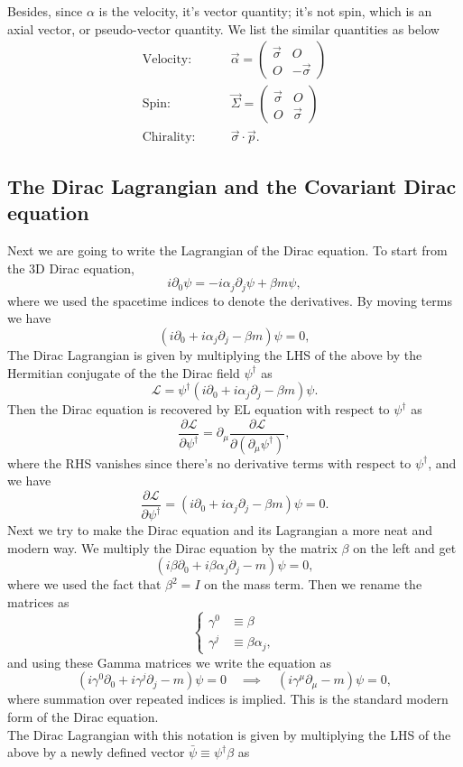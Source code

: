 \documentclass{article}
\newcommand{\be}{\begin{equation}}
\newcommand{\ee}{\end{equation}}
\newcommand{\ba}{\begin{array}}
\newcommand{\ea}{\end{array}}
\newcommand{\p}{\partial}
\renewcommand{\1}{\left}
\renewcommand{\2}{\right}
\newcommand{\ma}{\mathcal}
\newcommand{\rar}{\quad\implies\quad}
\newcommand{\m}{\mu}
\newcommand{\al}{\alpha}
\newcommand{\bet}{\beta}
\newcommand{\sig}{\sigma}
\begin{document}
Besides, since $\al$ is the velocity, it's vector quantity; it's not spin, which is an axial vector, or pseudo-vector quantity. We list the similar quantities as below
\be\begin{split}
\text{Velocity:}&\quad\quad \vec\al=\1(\ba{cc}\vec\sig&O\\O&-\vec\sig\ea\2)\\
\text{Spin:}&\quad\quad \vec\Sigma=\1(\ba{cc}\vec\sig&O\\O&\vec\sig\ea\2)\\
\text{Chirality:}&\quad\quad \vec\sig\cdot\vec p.
\end{split}\ee

\subsection{The Dirac Lagrangian and the Covariant Dirac equation}
Next we are going to write the Lagrangian of the Dirac equation. To start from the 3D Dirac equation,
\be
i\p_0\psi=-i\al_j\p_j\psi+\bet m\psi,
\ee
where we used the spacetime indices to denote the derivatives. By moving terms we have
\be
(i\p_0+i\al_j\p_j-\bet m)\psi=0,
\ee
The Dirac Lagrangian is given by multiplying the LHS of the above by the Hermitian conjugate of the  the Dirac field $\psi^\dag$ as
\be
\ma L=\psi^\dag(i\p_0+i\al_j\p_j-\bet m)\psi.
\ee
Then the Dirac equation is recovered by EL equation with respect to $\psi^\dag$ as 
\be
\frac{\p\ma L}{\p\psi^\dag}=\p_\m\frac{\p\ma L}{\p(\p_\m\psi^\dag)},
\ee
where the RHS vanishes since there's no derivative terms with respect to $\psi^\dag$, and we have
\be
\frac{\p\ma L}{\p\psi^\dag}=(i\p_0+i\al_j\p_j-\bet m)\psi=0.
\ee
Next we try to make the Dirac equation and its Lagrangian a more neat and modern way. We multiply the Dirac equation by the matrix $\bet$ on the left and get
\be
(i\bet\p_0+i\bet\al_j\p_j- m)\psi=0,
\ee
where we used the fact that $\bet^2=I$ on the mass term.
Then we rename the matrices as
\be\1\{\begin{split}
\gamma^0&\equiv\bet\\
\gamma^j&\equiv\bet\al_j,
\end{split}\2.\ee
and using these Gamma matrices we write the equation as
\be
(i\gamma^0\p_0+i\gamma^j\p_j-m)\psi=0 \rar (i\gamma^\m\p_\m-m)\psi= 0,
\ee
where summation over repeated indices is implied. This is the standard modern form of the Dirac equation.\\
The Dirac Lagrangian with this notation is given by multiplying the LHS of the above by a newly defined vector $\bar\psi\equiv\psi^\dag\bet$ as
\end{document}
